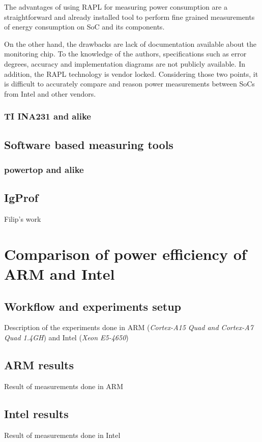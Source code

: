 \documentclass[a4paper]{jpconf}
\begin{document}
The advantages of using RAPL for measuring power consumption are a straightforward and already installed tool to perform fine grained measurements of energy consumption on SoC and its components.

On the other hand, the drawbacks are lack of documentation available about the monitoring chip. To the knowledge of the authors, specifications such as error degrees, accuracy and implementation diagrams are not publicly available. In addition, the RAPL technology is vendor locked. Considering those two points, it is difficult to accurately compare and reason power measurements between SoCs from Intel and other vendors.


\subsubsection{TI INA231 and alike}

\subsection{Software based measuring tools}
\subsubsection{powertop and alike}
\subsection{IgProf}
Filip's work \\


\section{Comparison of power efficiency of ARM and Intel}

 \subsection{Workflow and experiments setup}
    Description of the experiments done in ARM ({\it Cortex-A15 Quad and Cortex-A7 Quad 1.4GH}) and Intel ({\it Xeon E5-4650})

\subsection{ARM results}
    Result of measurements done in ARM


\subsection{Intel results}
    Result of measurements done in Intel
\end{document}
